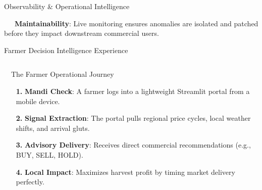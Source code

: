 \documentclass{beamer}
\begin{document}
\begin{frame}{Observability \& Operational Intelligence}
\vspace{0.15cm}
\begin{tcolorbox}[enhanced, colback=primaryblue!4, colframe=primaryblue!30, boxrule=0.35pt,
  arc=3.5pt, width=0.98\textwidth, left=4pt, right=4pt, top=2.5pt, bottom=2.5pt, boxsep=0pt,
  halign=center, shadow={0.5pt}{-0.5pt}{0pt}{black!8}]
    \fontsize{5.5pt}{6.5pt}\selectfont
    \textcolor{primaryDark}{~~~\textbf{Maintainability}: Live monitoring ensures anomalies are isolated and patched before they impact downstream commercial users.}
\end{tcolorbox}
\end{frame}

\begin{frame}{Farmer Decision Intelligence Experience}
\vspace{-0.2cm}

\begin{columns}[T]
    \begin{column}{0.48\textwidth}
        \begin{infocard}{~~The Farmer Operational Journey}
            \fontsize{6.8pt}{8.5pt}\selectfont
            \begin{enumerate}\setlength\itemsep{3.5pt}\setlength\parskip{0pt}
                \item[\textbf{1.}] \textbf{Mandi Check}: A farmer logs into a lightweight Streamlit portal from a mobile device.
                \item[\textbf{2.}] \textbf{Signal Extraction}: The portal pulls regional price cycles, local weather shifts, and arrival gluts.
                \item[\textbf{3.}] \textbf{Advisory Delivery}: Receives direct commercial recommendations (e.g., BUY, SELL, HOLD).
                \item[\textbf{4.}] \textbf{Local Impact}: Maximizes harvest profit by timing market delivery perfectly.
            \end{enumerate}
        \end{infocard}
    \end{column}
    

\end{columns}
\end{frame}
\end{document}
